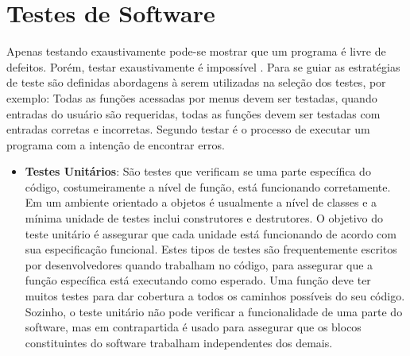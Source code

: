 \section{Testes de Software}

Apenas testando exaustivamente pode-se mostrar que um programa é livre de defeitos. Porém, testar exaustivamente é impossível . Para se guiar as estratégias de teste são definidas abordagens à serem utilizadas na seleção dos testes, por exemplo: Todas as funções acessadas por menus devem ser testadas, quando entradas do usuário são requeridas, todas as funções devem ser testadas com entradas corretas e incorretas. Segundo  testar é o processo de executar um programa com a intenção de encontrar erros.

\begin{itemize}
\item \textbf{Testes Unitários}: São testes que verificam se uma parte específica do código, costumeiramente a nível de função, está funcionando corretamente. Em um ambiente orientado a objetos é usualmente a nível de classes e a mínima unidade de testes inclui construtores e destrutores. O objetivo do teste unitário é assegurar que cada unidade está funcionando de acordo com sua especificação funcional. Estes tipos de testes são frequentemente escritos por desenvolvedores quando trabalham no código, para assegurar que a função específica está executando como esperado. Uma função deve ter muitos testes para dar cobertura a todos os caminhos possíveis do seu código. Sozinho, o teste unitário não pode verificar a funcionalidade de uma parte do software, mas em contrapartida é usado para assegurar que os blocos constituintes do software trabalham independentes dos demais.
\end{itemize}
